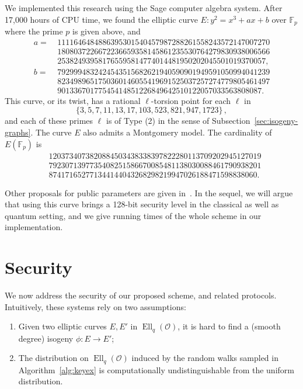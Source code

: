 \documentclass{article}
\newcommand{\F}{\mathbb{F}}
\renewcommand{\O}{\mathcal{O}}
\theoremstyle{definition}
\DeclareMathOperator{\Ell}{Ell}
\begin{document}
We implemented this research using the Sage computer algebra system.
After 17,000 hours of CPU time, we found the elliptic curve
$
	E : y^2 = x^3 + ax + b
$
over $\F_p$ where the prime $p$ is given above, and
\[
\begin{aligned}
a =\ & 1111646484886395301540457987288261558243572147007270 \\ 
& 1808037226672236659358145861235530764279830938006566 \\
& 253824939581765595814774014481950202045501019370057,\\
b =\ & 7929994832424543515682621940590901949591050994041239 \\
& 8234989651750360146055419691525037257274779805461497 \\ 
& 90133670177545414851226849642510122057033563808087.
\end{aligned}
\]
This curve, or its twist, has a rational $\ell$-torsion point 
for each $\ell$ in
\[
  \{3, 5, 7, 11, 13, 17, 103, 523, 821, 947, 1723\}
  \,,
\]
and each of these primes $\ell$ is of Type (2)
in the sense of Subsection~\ref{sec:isogeny-graphs}.
The curve $E$ also admits a Montgomery model.
The cardinality of $E(\F_p)$ is
\[
\begin{aligned}
& 1203734073820884503438338397822280113709202945127019 \\ 
& 7923071397735408251586670085481138030088461790938201 \\
& 874171652771344144043268298219947026188471598838060.
\end{aligned}
\]

Other proposals for public parameters are given in~\cite{todo:memoire}.
In the sequel, we will argue that using this curve brings a 128-bit security level
in the classical as well as quantum setting, and we give running times of the whole
scheme in our implementation.

\section{Security}
\label{sec:sec}

We now address the security of our proposed scheme, and related
protocols. Intuitively, these systems rely on two assumptions:
\begin{enumerate}
\item Given two elliptic curves $E,E'$ in $\Ell_q(\O)$, it is hard to
  find a (smooth degree) isogeny $ϕ:E→E'$;
\item The distribution on $\Ell_q(\O)$ induced by the random walks
  sampled in Algorithm~\ref{alg:keyex} is computationally
  undistinguishable from the uniform distribution.
\end{enumerate}
\end{document}
